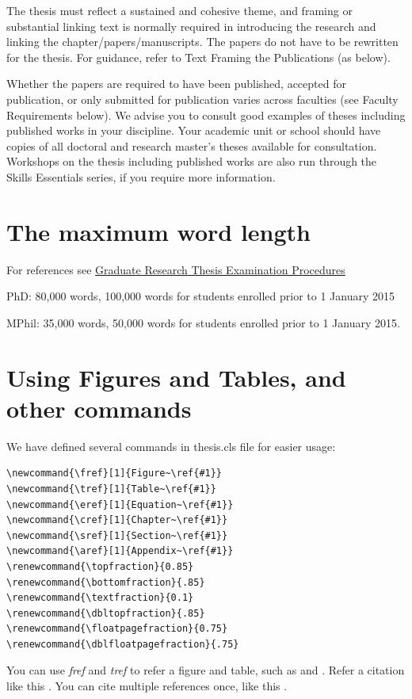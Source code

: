 The thesis must reflect a sustained and cohesive theme, and framing or substantial linking text is normally required in introducing the research and linking the chapter/papers/manuscripts. The papers do not have to be rewritten for the thesis. For guidance, refer to Text Framing the Publications (as below).

Whether the papers are required to have been published, accepted for publication, or only submitted for publication varies across faculties (see Faculty Requirements below). We advise you to consult good examples of theses including published works in your discipline. Your academic unit or school should have copies of all doctoral and research master's theses available for consultation. Workshops on the thesis including published works are also run through the Skills Essentials series, if you require more information.


\section{The maximum word length}
For references see \href{http://www.monash.edu/__data/assets/pdf_file/0011/911882/Graduate-Research-Thesis-Examination-Procedures.pdf}{Graduate Research Thesis Examination Procedures}

PhD: 80,000 words,  100,000 words for students enrolled prior to 1 January 2015

MPhil: 35,000 words, 50,000 words for students enrolled prior to 1 January 2015.

\section{Using Figures and Tables, and other commands}

We have defined several commands in thesis.cls file for easier usage:
\begin{verbatim}
\newcommand{\fref}[1]{Figure~\ref{#1}}
\newcommand{\tref}[1]{Table~\ref{#1}}
\newcommand{\eref}[1]{Equation~\ref{#1}}
\newcommand{\cref}[1]{Chapter~\ref{#1}}
\newcommand{\sref}[1]{Section~\ref{#1}}
\newcommand{\aref}[1]{Appendix~\ref{#1}}
\renewcommand{\topfraction}{0.85}
\renewcommand{\bottomfraction}{.85}
\renewcommand{\textfraction}{0.1}
\renewcommand{\dbltopfraction}{.85}
\renewcommand{\floatpagefraction}{0.75}
\renewcommand{\dblfloatpagefraction}{.75}
\end{verbatim}

You can use \textit{fref} and \textit{tref} to refer a figure and table, such as  and . Refer a citation like this \cite{Reference1}. You can cite multiple references once, like this \cite{Reference1,Reference2,Reference3}.



